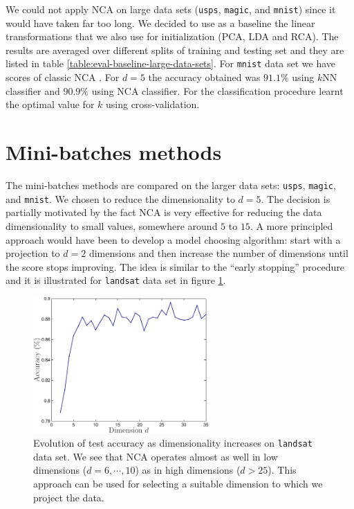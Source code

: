 We could not apply NCA on large data sets (\texttt{usps}, \texttt{magic}, and \texttt{mnist}) since it would have taken far too long. We decided to use as a baseline the linear transformations that we also use for initialization (PCA, LDA and RCA). The results are averaged over different splits of training and testing set and they are listed in table \ref{table:eval-baseline-large-data-sets}. For \texttt{mnist} data set we have scores of classic NCA \citep{singh2010}. For $d=5$ the accuracy obtained was $91.1\%$ using $k$NN classifier and $90.9\%$ using NCA classifier. For the classification procedure \citeauthor{singh2010} learnt the optimal value for $k$ using cross-validation.

\section{Mini-batches methods}
\label{sec:method-comparison}

 The mini-batches methods are compared on the larger data sets: \texttt{usps}, \texttt{magic}, and \texttt{mnist}. We chosen to reduce the dimensionality to $d=5$. The decision is partially motivated by the fact NCA is very effective for reducing the data dimensionality to small values, somewhere around $5$ to $15$. A more principled approach would have been to develop a model choosing algorithm: start with a projection to $d=2$ dimensions and then increase the number of dimensions until the score stops improving. The idea is similar to the ``early stopping'' procedure and it is illustrated for \texttt{landsat} data set in figure \ref{fig:landsat-evolution}.

  \begin{figure}
   \centering\includegraphics[width=0.6\textwidth]{images/landsat-evolution}
   \caption{Evolution of test accuracy as dimensionality increases on \texttt{landsat} data set. We see that NCA operates almost as well in low dimensions ($d=6,\cdots,10$) as in high dimensions ($d>25$). This approach can be used for selecting a suitable dimension to which we project the data.}
   \label{fig:landsat-evolution}
  \end{figure}


